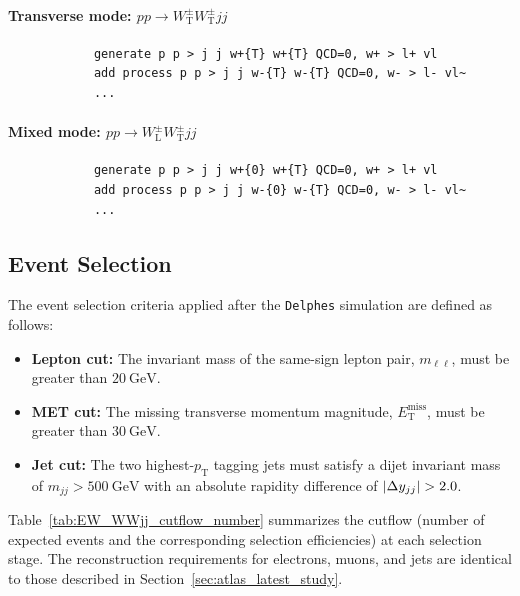 \documentclass[12pt]{article}
\begin{document}
        \paragraph{Transverse mode: $pp \to W^{\pm}_{\text{T}}W^{\pm}_{\text{T}} jj$}
        \begin{lstlisting}
            generate p p > j j w+{T} w+{T} QCD=0, w+ > l+ vl
            add process p p > j j w-{T} w-{T} QCD=0, w- > l- vl~
            ...
        \end{lstlisting}

        \paragraph{Mixed mode: $pp \to W^{\pm}_{\text{L}}W^{\pm}_{\text{T}} jj$}
        \begin{lstlisting}
            generate p p > j j w+{0} w+{T} QCD=0, w+ > l+ vl
            add process p p > j j w-{0} w-{T} QCD=0, w- > l- vl~
            ...
        \end{lstlisting}


    \subsection{Event Selection}%
    \label{sub:event_selection}

        The event selection criteria applied after the \verb|Delphes| simulation are defined as follows:
        \begin{itemize}
            \item \textbf{Lepton cut:} The invariant mass of the same-sign lepton pair, $m_{\ell\ell}$, must be greater than $20~\mathrm{GeV}$.
            \item \textbf{MET cut:} The missing transverse momentum magnitude, $E_{\text{T}}^{\text{miss}}$, must be greater than $30~\mathrm{GeV}$.
            \item \textbf{Jet cut:} The two highest-$p_{\text{T}}$ tagging jets must satisfy a dijet invariant mass of $m_{jj} > 500~\mathrm{GeV}$ with an absolute rapidity difference of $\abs{\Delta y_{jj}} > 2.0$.
        \end{itemize}

        Table~\ref{tab:EW_WWjj_cutflow_number} summarizes the cutflow (number of expected events and the corresponding selection efficiencies) at each selection stage. The reconstruction requirements for electrons, muons, and jets are identical to those described in Section~\ref{sec:atlas_latest_study}.
\end{document}
